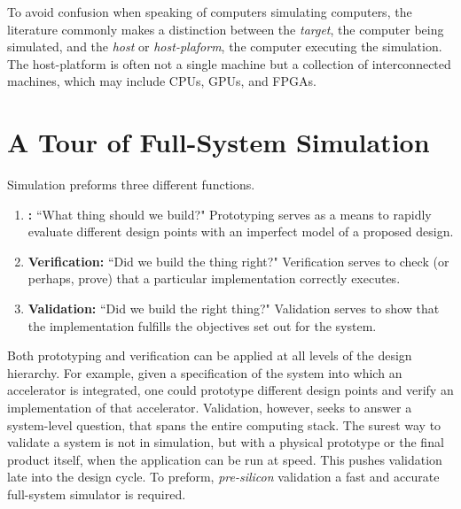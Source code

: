 To avoid confusion when speaking of computers simulating computers, the
literature commonly makes a distinction between the \emph{target}, the computer
being simulated, and the \emph{host} or \emph{host-plaform}, the computer
executing the simulation. The host-platform is often not a single machine but
a collection of interconnected machines, which may include CPUs,
GPUs, and FPGAs.

\section{A Tour of Full-System Simulation}

Simulation preforms three different functions.

\begin{enumerate}

    \item \textbf{:} ``What thing should we
        build?" Prototyping serves as a means to rapidly evaluate different
        design points with an imperfect model of a proposed design.

    \item \textbf{Verification:} ``Did we build the thing right?" Verification
        serves to check (or perhaps, prove) that a particular implementation
        correctly executes.

    \item \textbf{Validation:} ``Did we build the right thing?" Validation
        serves to show that the implementation fulfills the objectives set out
        for the system.

\end{enumerate}

Both prototyping and verification can be applied at all levels of the design
hierarchy.  For example, given a specification of the system into which an
accelerator is integrated, one could prototype different design points and
verify an implementation of that accelerator. Validation, however, seeks to
answer a system-level question, that spans the entire computing stack.  The
surest way to validate a system is not in simulation, but with a physical
prototype or the final product itself, when the application can be run at
speed. This pushes validation late into the design cycle. To preform,
\emph{pre-silicon} validation a fast and accurate full-system simulator is
required.


